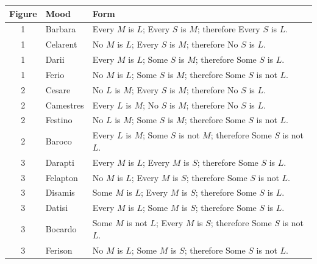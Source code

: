 \documentclass[11pt]{article}
\begin{document}
\begin{center}
\small
\begin{tabularx}{\textwidth}{c l X}
\toprule
\textbf{Figure} & \textbf{Mood} & \textbf{Form}\\
\midrule
1 & Barbara &
Every \(M\) is \(L\); Every \(S\) is \(M\); therefore Every \(S\) is \(L\).\\

1 & Celarent &
No \(M\) is \(L\); Every \(S\) is \(M\); therefore No \(S\) is \(L\).\\

1 & Darii &
Every \(M\) is \(L\); Some \(S\) is \(M\); therefore Some \(S\) is \(L\).\\

1 & Ferio &
No \(M\) is \(L\); Some \(S\) is \(M\); therefore Some \(S\) is not \(L\).\\
\midrule

2 & Cesare &
No \(L\) is \(M\); Every \(S\) is \(M\); therefore No \(S\) is \(L\).\\

2 & Camestres &
Every \(L\) is \(M\); No \(S\) is \(M\); therefore No \(S\) is \(L\).\\

2 & Festino &
No \(L\) is \(M\); Some \(S\) is \(M\); therefore Some \(S\) is not \(L\).\\

2 & Baroco &
Every \(L\) is \(M\); Some \(S\) is not \(M\); therefore Some \(S\) is not \(L\).\\
\midrule

3 & Darapti &
Every \(M\) is \(L\); Every \(M\) is \(S\); therefore Some \(S\) is \(L\).\\

3 & Felapton &
No \(M\) is \(L\); Every \(M\) is \(S\); therefore Some \(S\) is not \(L\).\\

3 & Disamis &
Some \(M\) is \(L\); Every \(M\) is \(S\); therefore Some \(S\) is \(L\).\\

3 & Datisi &
Every \(M\) is \(L\); Some \(M\) is \(S\); therefore Some \(S\) is \(L\).\\

3 & Bocardo &
Some \(M\) is not \(L\); Every \(M\) is \(S\); therefore Some \(S\) is not \(L\).\\

3 & Ferison &
No \(M\) is \(L\); Some \(M\) is \(S\); therefore Some \(S\) is not \(L\).\\
\bottomrule
\end{tabularx}
\end{center}
\end{document}
